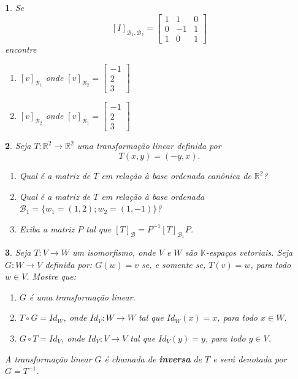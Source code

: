 \documentclass[12pt]{exam}
\newtheorem{exercicio}{}
\newcommand{\real}{\mathbb{R}}
\newcommand{\cp}[1]{\mathbb{#1}}
\begin{document}
\begin{exercicio}
  Se
  \[
    [I]_{\mathcal{B}_1,\mathcal{B}_2} = \begin{bmatrix}
      1 & 1 & 0\\
      0 & -1 & 1\\
      1 & 0 & 1
    \end{bmatrix}
  \]
  encontre
  \begin{enumerate}[label=({\alph*})]
    \item $[v]_{\mathcal{B}_1}$ onde $[v]_{\mathcal{B}_2} = \begin{bmatrix}
      -1\\2\\3
    \end{bmatrix}$
    \item $[v]_{\mathcal{B}_2}$ onde $[v]_{\mathcal{B}_1} = \begin{bmatrix}
      -1\\2\\3
    \end{bmatrix}$
  \end{enumerate}
\end{exercicio}

\begin{exercicio}
  Seja $T : \real^2 \to \real^2$ uma transforma\c{c}\~ao linear definida por
  \[
    T(x,y) = (-y,x).
  \]
  \begin{enumerate}[label=({\alph*})]
    \item Qual \'e a matriz de $T$ em rela\c{c}\~ao \`a base ordenada can\^onica de $\real^2$?
    \item Qual \'e a matriz de $T$ em rela\c{c}\~ao \`a base ordenada $\mathcal{B}_1 = \{w_1 = (1,2); w_2 = (1,-1)\}$?
    \item Exiba a matriz $P$ tal que $[T]_{\mathcal{B}} = P^{-1}[T]_{\mathcal{B}_1}P$.
  \end{enumerate}
\end{exercicio}

\begin{exercicio}
  Seja $T : V \to W$ um isomorfismo, onde $V$ e $W$ são $\cp{K}$-espaços vetoriais. Seja $G : W \to V$ definida por: $G(w) = v$ se, e somente se, $T(v) = w$, para todo $w \in V$. Mostre que:
  \begin{enumerate}[label=({\alph*})]
    \item $G$ é uma transformação linear.
    \item $T\circ G = Id_W$, onde $Id_V : W \to W$ tal que $Id_W(x) = x$, para todo $x \in W$.
    \item $G\circ T = Id_V$, onde $Id_V : V \to V$ tal que $Id_V(y) = y$, para todo $y \in V$.
  \end{enumerate}
  A transformação linear $G$ é chamada de \textbf{inversa} de $T$ e será denotada por $G = T^{-1}$.
\end{exercicio}
\end{document}
